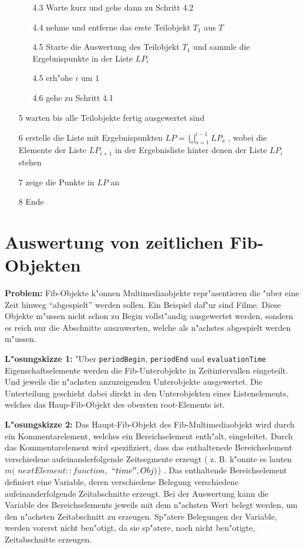 \begin{itemize}
\begin{itemize}
  \item [4.3] Warte kurz und gehe dann zu Schritt 4.2
  \item [4.4] nehme und entferne das erste Teilobjekt $T_1$ aus $T$
  \item [4.5] Starte die Auswertung des Teilobjekt $T_1$ und sammle die Ergebnispunkte in der Liste $LP_i$
  \item [4.5] erh"ohe $i$ um $1$
  \item [4.6] gehe zu Schritt 4.1
 \end{itemize}
 \item [5] warten bis alle Teilobjekte fertig ausgewertet sind
 \item [6] erstelle die Liste mit Ergebnispunkten $LP=\bigcup_{a=1}^{i-1} LP_a$ , wobei die Elemente der Liste $LP_{i+1}$ in der Ergebnisliste hinter denen der Liste $LP_i$ stehen
 \item [7] zeige die Punkte in $LP$ an
 \item [8] Ende
\end{itemize}


\section{Auswertung von zeitlichen Fib-Objekten}

\bigskip\noindent
\textbf{Problem:}
Fib-Objekte k"onnen Multimediaobjekte repr"asentieren die "uber eine Zeit hinweg ``abgespielt'' werden sollen. Ein Beispiel daf"ur sind Filme. Diese Objekte m"ussen nicht schon zu Begin vollst"andig ausgewertet werden, sondern es reich nur die Abschnitte auszuwerten, welche als n"achstes abgespielt werden m"ussen.

\bigskip\noindent
\textbf{L"osungskizze 1:}
"Uber \verb|periodBegin|, \verb|periodEnd| und \verb|evaluationTime| Eigenschaftselemente werden die Fib-Unterobjekte in Zeitintervallen eingeteilt. Und jeweils die n"achsten anzuzeigenden Unterobjekte ausgewertet. Die Unterteilung geschieht dabei direkt in den Unterobjekten eines Listenelements, welches das Haup-Fib-Objekt des obersten root-Elements ist.

\bigskip\noindent
\textbf{L"osungskizze 2:}
Das Haupt-Fib-Objekt des Fib-Multimediaobjekt wird durch ein Kommentarelement, welches ein Bereichselement enth"alt, eingeleitet.
Durch das Kommentarelement wird spezifiziert, dass das enthaltenede Bereichselement verschiedene aufeinanderfolgende Zeitsegmente erzeugt ( z. B. k"onnte es lauten $m($ $nextElement::function,$ $``time'', Obj )$) . Das enthaltende Bereichselement definiert eine Variable, deren verschiedene Belegung verschiedene aufeinanderfolgende Zeitabschnitte erzeugt. Bei der Auswertung kann die Variable des Bereichselements jeweils mit dem n"achsten Wert belegt werden, um den n"achsten Zeitabschnitt zu erzeugen. Sp"atere Belegungen der Variable, werden vorerst nicht ben"otigt, da sie sp"atere, noch nicht ben"otigte, Zeitabschnitte erzeugen.



